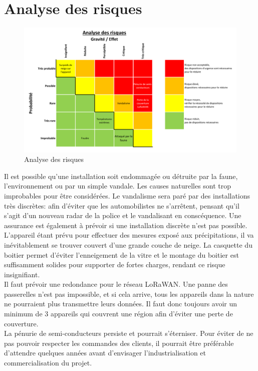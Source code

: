 \section{Analyse des risques}
\begin{figure}[H]
    \centering
    \includegraphics[width=\linewidth]{Images/business/risiko.PNG}
    \caption[]{Analyse des risques}
    \label{fig:risiko}
\end{figure}

Il est possible qu'une installation soit endommagée ou détruite par la faune, l'environnement
ou par un simple vandale. Les causes naturelles sont trop improbables pour être considérées.
Le vandalisme sera paré par des installations très discrètes: afin d'éviter que les automobilistes
ne s'arrêtent, pensant qu'il s'agit d'un nouveau radar de la police et le vandalisant en conscéquence.
Une assurance est également à prévoir si une installation discrète n'est pas possible.\\[0.2cm]
L'appareil étant prévu pour effectuer des mesures exposé aux précipitations, il va inévitablement se trouver couvert
d'une grande couche de neige. La casquette du boitier permet d'éviter l'enneigement de la vitre et
le montage du boitier est suffisamment solides pour supporter de fortes charges, rendant ce risque insignifiant.\\[0.2cm]
Il faut prévoir une redondance pour le réseau LoRaWAN. Une panne des passerelles n'est pas impossible, et si cela arrive,
tous les appareils dans la nature ne pourraient plus transmettre leurs données. Il faut donc toujours avoir
un minimum de 3 appareils qui couvrent une région afin d'éviter une perte de couverture.\\[0.2cm]
La pénurie de semi-conducteurs persiste et pourrait s'éterniser. Pour éviter de
ne pas pouvoir respecter les commandes des clients, il pourrait être préférable d'attendre quelques années avant
d'envisager l'industrialisation et commercialisation du projet.